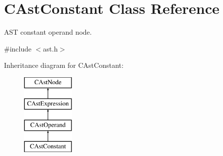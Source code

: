 \hypertarget{classCAstConstant}{\section{C\-Ast\-Constant Class Reference}
\label{classCAstConstant}
}


A\-S\-T constant operand node.  




{\ttfamily \#include $<$ast.\-h$>$}

Inheritance diagram for C\-Ast\-Constant\-:\begin{figure}[H]
\begin{center}
\leavevmode
\includegraphics[height=4.000000cm]{classCAstConstant}
\end{center}
\end{figure}
